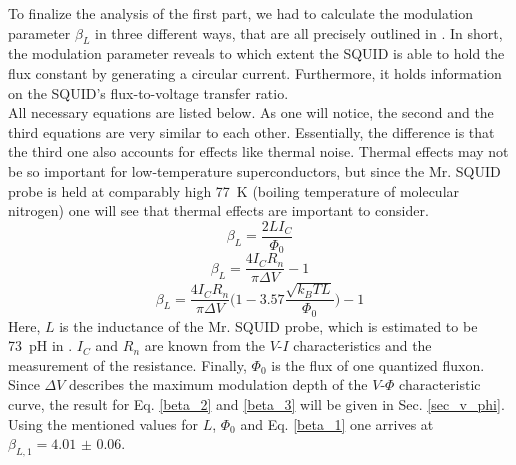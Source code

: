 \documentclass[a4paper,10pt]{article}
\begin{document}
To finalize the analysis of the first part, we had to calculate the modulation parameter $\beta_L$ in three different ways, that are all precisely outlined in \cite{skriptum}. In short, the modulation parameter reveals to which extent the SQUID is able to hold the flux constant by generating a circular current. Furthermore, it holds information on the SQUID's flux-to-voltage transfer ratio. 
\\
All necessary equations are listed below. As one will notice, the second and the third equations are very similar to each other. Essentially, the difference is that the third one also accounts for effects like thermal noise. Thermal effects may not be so important for low-temperature superconductors, but since the Mr. SQUID probe is held at comparably high \SI{77}{\kelvin} (boiling temperature of molecular nitrogen) one will see that thermal effects are important to consider. 
\begin{equation}
    \label{beta_1}
    \beta_L = \frac{2 L I_C}{\Phi_0}
\end{equation}
\begin{equation}
    \label{beta_2}
    \beta_L = \frac{4 I_C R_n}{\pi \Delta V} - 1
\end{equation}
\begin{equation}
    \label{beta_3}
    \beta_L = \frac{4 I_C R_n}{\pi \Delta V} \big( 1 - 3.57  \frac{\sqrt{k_B T L}}{\Phi_0} \big) - 1
\end{equation}
Here, $L$ is the inductance of the Mr. SQUID probe, which is estimated to be \SI{73}{\pico \henry} in \cite{skriptum}. $I_C$ and $R_n$ are known from the $V$-$I$ characteristics and the measurement of the resistance. Finally, $\Phi_0$ is the flux of one quantized fluxon. Since $\Delta V$ describes the maximum modulation depth of the $V$-$\Phi$ characteristic curve, the result for Eq. \ref{beta_2} and \ref{beta_3} will be given in Sec. \ref{sec_v_phi}. 
\\
Using the mentioned values for $L$, $\Phi_0$ and Eq. \ref{beta_1} one arrives at $\beta_{L,1} = \num{4.01(6)}$. 
\end{document}
